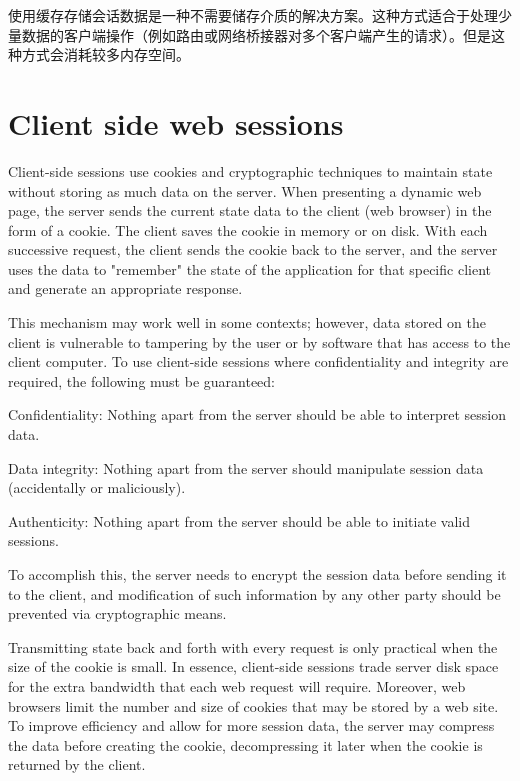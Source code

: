 使用缓存存储会话数据是一种不需要储存介质的解决方案。这种方式适合于处理少量数据的客户端操作（例如路由或网络桥接器对多个客户端产生的请求）。但是这种方式会消耗较多内存空间。



\chapter{Client side web sessions}


Client-side sessions use cookies and cryptographic techniques to maintain state without storing as much data on the server. When presenting a dynamic web page, the server sends the current state data to the client (web browser) in the form of a cookie. The client saves the cookie in memory or on disk. With each successive request, the client sends the cookie back to the server, and the server uses the data to "remember" the state of the application for that specific client and generate an appropriate response.

This mechanism may work well in some contexts; however, data stored on the client is vulnerable to tampering by the user or by software that has access to the client computer. To use client-side sessions where confidentiality and integrity are required, the following must be guaranteed:

\begin{compactenum}
\item Confidentiality: Nothing apart from the server should be able to interpret session data.
\item Data integrity: Nothing apart from the server should manipulate session data (accidentally or maliciously).
\item Authenticity: Nothing apart from the server should be able to initiate valid sessions.
\end{compactenum}

To accomplish this, the server needs to encrypt the session data before sending it to the client, and modification of such information by any other party should be prevented via cryptographic means.

Transmitting state back and forth with every request is only practical when the size of the cookie is small. In essence, client-side sessions trade server disk space for the extra bandwidth that each web request will require. Moreover, web browsers limit the number and size of cookies that may be stored by a web site. To improve efficiency and allow for more session data, the server may compress the data before creating the cookie, decompressing it later when the cookie is returned by the client.


